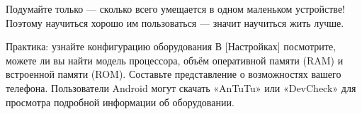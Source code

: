 Подумайте только — сколько всего умещается в одном маленьком устройстве! Поэтому научиться хорошо им пользоваться — значит научиться жить лучше.

\begin{tcbpractice}{Практика: узнайте конфигурацию оборудования}
В [Настройках] посмотрите, можете ли вы найти модель процессора, объём оперативной памяти (RAM) и встроенной памяти (ROM). Составьте представление о возможностях вашего телефона. Пользователи Android могут скачать «AnTuTu» или «DevCheck» для просмотра подробной информации об оборудовании.

\end{tcbpractice}
